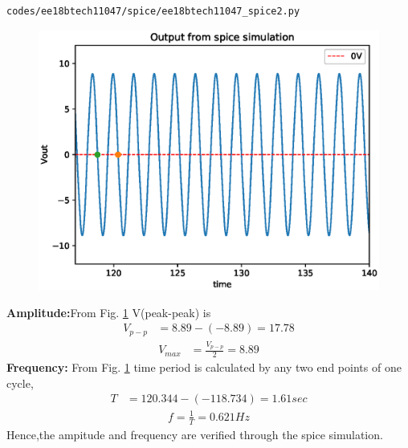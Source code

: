 \begin{enumerate}[label=\arabic*.,ref=\theenumi]
\begin{lstlisting}
codes/ee18btech11047/spice/ee18btech11047_spice2.py
\end{lstlisting}
\begin{figure}[!ht]
\centering
\includegraphics[width=\columnwidth]{./figs/ee18btech11047/ee18btech11047_spice2.eps}
\caption{}
\label{fig:ee18btech11047_spice2}
\end{figure}
\renewcommand{\thefigure}{\theenumi}
%
\textbf{Amplitude:}From Fig. \ref{fig:ee18btech11047_spice2} V(peak-peak) is 
\begin{align}
V_{p-p} &= 8.89-(-8.89)= 17.78
\end{align}
\begin{align}
V_{max} &= \frac{V_{p-p}}{2} = 8.89
\end{align}
\textbf{Frequency:} From Fig. \ref{fig:ee18btech11047_spice2} time period is calculated by any two end points of one cycle,
\begin{align}
T&=120.344-(-118.734) = 1.61 sec
\end{align}
\begin{align}
f = \frac{1}{T} = 0.621 Hz
\end{align}
Hence,the ampitude and frequency are verified through the spice simulation.
\end{enumerate}
